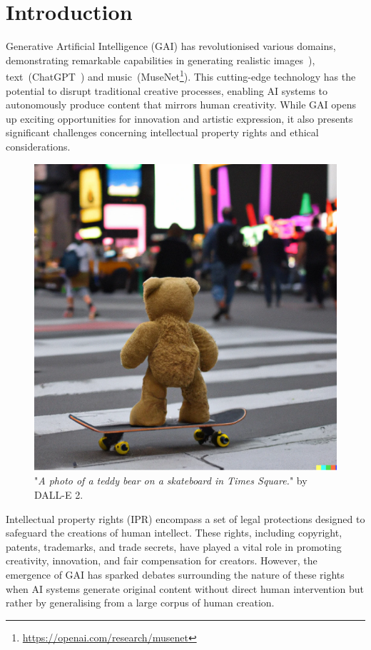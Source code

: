 \documentclass[conference]{IEEEtran}
\begin{document}
\section{Introduction}
Generative Artificial Intelligence (GAI) has revolutionised various domains, demonstrating remarkable capabilities in generating realistic images~\cite{rombach_high-resolution_2022,ramesh_hierarchical_2022}), %
text~(ChatGPT~\cite{openai_gpt-4_2023}) and music~(MuseNet\footnote{\url{https://openai.com/research/musenet}}). %
This cutting-edge technology has the potential to disrupt traditional creative processes, enabling AI systems to autonomously produce content that mirrors human creativity. 
While GAI opens up exciting opportunities for innovation and artistic expression, it also presents significant challenges concerning intellectual property rights and ethical considerations.
\begin{figure}[ht]
    \centering
    \includegraphics[width=\linewidth]{figures/teddy.png}
    \caption["\textit{A photo of a teddy bear on a skateboard in Times Square.}" by DALL-E 2]{"\textit{A photo of a teddy bear on a skateboard in Times Square.}" by DALL-E 2\footnotemark.
    } 
    \label{fig:enter-label}
\end{figure}
Intellectual property rights (IPR) encompass a set of legal protections designed to safeguard the creations of human intellect. These rights, including copyright, patents, trademarks, and trade secrets, have played a vital role in promoting creativity, innovation, and fair compensation for creators. However, the emergence of GAI has sparked debates surrounding the nature of these rights when AI systems generate original content without direct human intervention but rather by generalising from a large corpus of human creation.
\end{document}
